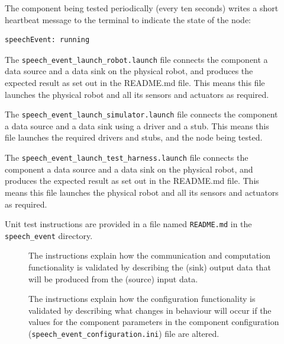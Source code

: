 \documentclass{CSSRforAfrica}
\newcommand{\checkboxChecked}{\fbox{\ding{51}}} %
\newcommand{\checkboxDashed}{\fbox{--}}         %
\begin{document}
\begin{description}
\item[\checkboxChecked]   The component being tested periodically (every ten seconds) writes a short heartbeat message to the terminal to indicate the state of the node:
{\small 
\begin{verbatim}
speechEvent: running
\end{verbatim}}

\item[\checkboxDashed] The {\small \verb+speech_event_launch_robot.launch+} file connects the component a data source and a data sink on the physical robot, and produces the expected result as set out in the README.md file. This means this file launches the physical robot and all its sensors and actuators as required.

\item[\checkboxDashed]   The {\small \verb+speech_event_launch_simulator.launch+} file connects the component a data source and a data sink using a driver and a stub. This means this file launches the required drivers and stubs, and the node being tested.

\item[\checkboxDashed]   The {\small \verb+speech_event_launch_test_harness.launch+} file connects the component a data source and a data sink on the physical robot, and produces the expected result as set out in the README.md file. This means this file launches the physical robot and all its sensors and actuators as required.

\item[\checkboxChecked] Unit test instructions are provided in a file named {\small \verb+README.md+} in the  {\small \verb+speech_event+} directory.


\begin{description}

\item[\checkboxChecked] The instructions explain how the communication and computation functionality is validated by describing the (sink) output data that will be produced from the (source) input data.  

\item[\checkboxChecked] The instructions explain how the configuration functionality is validated by describing what changes in behaviour will occur if the values for the component parameters in the component configuration ({\small \verb+speech_event_configuration.ini+}) file are altered.

\end{description}

\end{description} 
\end{document}
